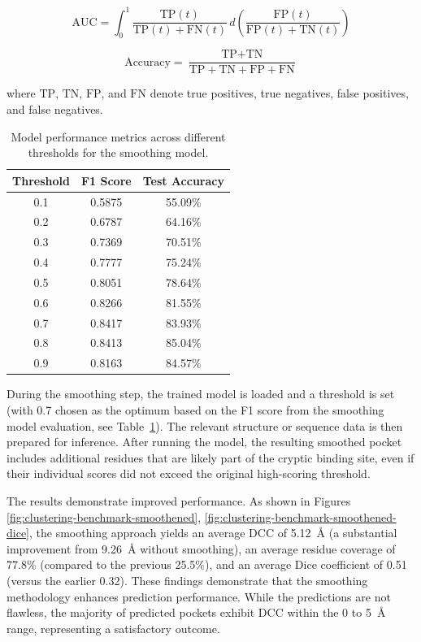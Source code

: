 \begin{equation}
\text{AUC} = \int_0^1 \frac{\text{TP}(t)}{\text{TP}(t) + \text{FN}(t)} \, d\left( \frac{\text{FP}(t)}{\text{FP}(t) + \text{TN}(t)} \right)
\label{eq:auc}
\end{equation}

\begin{equation}
\text{Accuracy} = \frac{\text{TP} + \text{TN}}{\text{TP} + \text{TN} + \text{FP} + \text{FN}}
\label{eq:accuracy}
\end{equation}

where $\text{TP}$, $\text{TN}$, $\text{FP}$, and $\text{FN}$ denote true positives, true negatives, false positives, and false negatives.

\begin{table}[htbp]
    \centering
    \caption{Model performance metrics across different thresholds for the smoothing model.}
    \label{tab:smoothing-thresholds}
    \begin{tabular}{c|c|c}
        \hline
        \textbf{Threshold} & \textbf{F1 Score} & \textbf{Test Accuracy} \\
        \hline
        0.1 & 0.5875 & 55.09\% \\
        0.2 & 0.6787 & 64.16\% \\
        0.3 & 0.7369 & 70.51\% \\
        0.4 & 0.7777 & 75.24\% \\
        0.5 & 0.8051 & 78.64\% \\
        0.6 & 0.8266 & 81.55\% \\
        0.7 & 0.8417 & 83.93\% \\
        0.8 & 0.8413 & 85.04\% \\
        0.9 & 0.8163 & 84.57\% \\
        \hline
    \end{tabular}
\end{table}

During the smoothing step, the trained model is loaded and a threshold is set (with 0.7 chosen as the optimum based on the F1 score from the smoothing model evaluation, see Table~\ref{tab:smoothing-thresholds}). The relevant structure or sequence data is then prepared for inference. After running the model, the resulting smoothed pocket includes additional residues that are likely part of the cryptic binding site, even if their individual scores did not exceed the original high-scoring threshold.

The results demonstrate improved performance. As shown in Figures \ref{fig:clustering-benchmark-smoothened}, \ref{fig:clustering-benchmark-smoothened-dice}, the smoothing approach yields an average DCC of 5.12~\AA{} (a substantial improvement from 9.26~\AA{} without smoothing), an average residue coverage of 77.8\% (compared to the previous 25.5\%), and an average Dice coefficient of 0.51 (versus the earlier 0.32). These findings demonstrate that the smoothing methodology enhances prediction performance. While the predictions are not flawless, the majority of predicted pockets exhibit DCC within the 0 to 5~\AA{} range, representing a satisfactory outcome.

